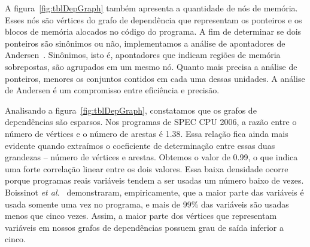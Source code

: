 \documentclass{llncs}
\begin{document}
A figura~\ref{fig:tblDepGraph} também apresenta a quantidade de nós de memória.
Esses nós são vértices do grafo de dependência que representam os ponteiros
e os blocos de memória alocados no código do programa.
A fim de determinar se dois ponteiros são sinônimos ou não, implementamos
a análise de apontadores de Andersen~\cite{Andersen94}.
Sinônimos, isto é, apontadores que indicam regiões de memória sobrepostas, são
agrupados em um mesmo nó.
Quanto mais precisa a análise de ponteiros, menores os conjuntos contidos em
cada uma dessas unidades.
A análise de Andersen é um compromisso entre eficiência e precisão.

Analisando a figura~\ref{fig:tblDepGraph}, constatamos que os grafos de
dependências são esparsos.
Nos programas de SPEC CPU 2006, a razão entre o número de vértices e o número
de arestas é 1.38.
Essa relação fica ainda mais evidente quando extraímos o coeficiente de
determinação entre essas duas grandezas -- número de vértices e arestas.
Obtemos o valor de 0.99, o que indica uma forte correlação linear entre os
dois valores.
Essa baixa densidade ocorre porque programas reais variáveis tendem a ser
usadas um número baixo de vezes.
Boissinot {\em et al.}~\cite{Benoit08} demonstraram, empiricamente, que
a maior parte das variáveis é usada somente uma vez no programa, e mais de
99\% das variáveis são usadas menos que cinco vezes.
Assim, a maior parte dos vértices que representam variáveis em nossos grafos de
dependências possuem grau de saída inferior a cinco.
\end{document}
